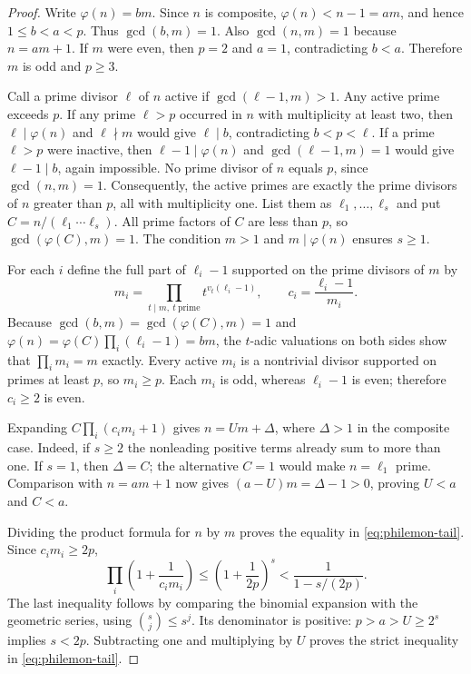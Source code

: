 \documentclass[11pt,a4paper]{article}
\theoremstyle{definition}\newtheorem{definition}[theorem]{Definition}
\theoremstyle{remark}\newtheorem{remark}[theorem]{Remark}
\begin{document}
\begin{proof}
Write $\varphi(n)=bm$.  Since $n$ is composite,
$\varphi(n)<n-1=am$, and hence $1\leq b<a<p$.  Thus
$\gcd(b,m)=1$.  Also $\gcd(n,m)=1$ because $n=am+1$.
If $m$ were even, then $p=2$ and $a=1$, contradicting $b<a$.
Therefore $m$ is odd and $p\geq3$.

Call a prime divisor $\ell$ of $n$ active if
$\gcd(\ell-1,m)>1$.  Any active prime exceeds $p$.  If any prime
$\ell>p$ occurred in $n$ with multiplicity at least two, then
$\ell\mid\varphi(n)$ and $\ell\nmid m$ would give
$\ell\mid b$, contradicting $b<p<\ell$.
If a prime $\ell>p$ were inactive, then
$\ell-1\mid\varphi(n)$ and $\gcd(\ell-1,m)=1$ would give
$\ell-1\mid b$, again impossible.  No prime divisor of $n$ equals
$p$, since $\gcd(n,m)=1$.  Consequently, the active primes are exactly
the prime divisors of $n$ greater than $p$, all with multiplicity one.
List them as $\ell_1,\ldots,\ell_s$ and put
$C=n/(\ell_1\cdots\ell_s)$.  All prime factors of $C$ are less than
$p$, so $\gcd(\varphi(C),m)=1$.  The condition $m>1$ and
$m\mid\varphi(n)$ ensures $s\geq1$.

For each $i$ define the full part of $\ell_i-1$ supported on the prime
divisors of $m$ by
\[
 m_i=\prod_{t\mid m,\ t\ \mathrm{prime}}t^{v_t(\ell_i-1)},
 \qquad c_i=\frac{\ell_i-1}{m_i}.
\]
Because $\gcd(b,m)=\gcd(\varphi(C),m)=1$ and
$\varphi(n)=\varphi(C)\prod_i(\ell_i-1)=bm$, the $t$-adic
valuations on both sides show that $\prod_i m_i=m$ exactly.
Every active $m_i$ is a nontrivial divisor supported on primes at least
$p$, so $m_i\geq p$.  Each $m_i$ is odd, whereas $\ell_i-1$ is even;
therefore $c_i\geq2$ is even.

Expanding $C\prod_i(c_i m_i+1)$ gives
$n=Um+\Delta$, where $\Delta>1$ in the composite case.  Indeed, if
$s\geq2$ the nonleading positive terms already sum to more than one.
If $s=1$, then $\Delta=C$; the alternative $C=1$ would make
$n=\ell_1$ prime.  Comparison with $n=am+1$ now gives
$(a-U)m=\Delta-1>0$, proving $U<a$ and $C<a$.

Dividing the product formula for $n$ by $m$ proves the equality in
\eqref{eq:philemon-tail}.  Since $c_i m_i\geq2p$,
\[
 \prod_i\left(1+\frac1{c_i m_i}\right)
 \leq\left(1+\frac1{2p}\right)^s
 <\frac1{1-s/(2p)}.
\]
The last inequality follows by comparing the binomial expansion with
the geometric series, using $\binom{s}{j}\leq s^j$.
Its denominator is positive: $p>a>U\geq2^s$ implies $s<2p$.
Subtracting one and multiplying by $U$ proves the strict inequality
in \eqref{eq:philemon-tail}.
\end{proof}
\end{document}
